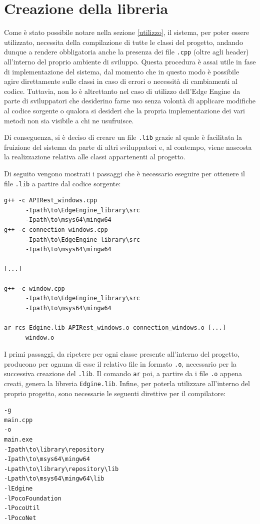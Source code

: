 \section{Creazione della libreria}
Come è stato possibile notare nella sezione \ref{utilizzo}, il sistema, per poter essere utilizzato, necessita della compilazione di tutte le classi del progetto, andando dunque a rendere obbligatoria anche la presenza dei file \texttt{.cpp} (oltre agli header) all'interno del proprio ambiente di sviluppo. Questa procedura è assai utile in fase di implementazione del sistema, dal momento che in questo modo è possibile agire direttamente sulle classi in caso di errori o necessità di cambiamenti al codice. Tuttavia, non lo è altrettanto nel caso di utilizzo dell'Edge Engine da parte di sviluppatori che desiderino farne uso senza volontà di applicare modifiche al codice sorgente o qualora si desideri che la propria implementazione dei vari metodi non sia visibile a chi ne usufruisce.

Di conseguenza, si è deciso di creare un file \texttt{.lib} grazie al quale è facilitata la fruizione del sistema da parte di altri sviluppatori e, al contempo, viene nascosta la realizzazione relativa alle classi appartenenti al progetto.

Di seguito vengono mostrati i passaggi che è necessario eseguire per ottenere il file \texttt{.lib} a partire dal codice sorgente:

\begin{verbatim}
g++ -c APIRest_windows.cpp 
      -Ipath\to\EdgeEngine_library\src 
      -Ipath\to\msys64\mingw64 
g++ -c connection_windows.cpp 
      -Ipath\to\EdgeEngine_library\src 
      -Ipath\to\msys64\mingw64 

[...]

g++ -c window.cpp
      -Ipath\to\EdgeEngine_library\src 
      -Ipath\to\msys64\mingw64 
 
ar rcs Edgine.lib APIRest_windows.o connection_windows.o [...] 
      window.o
\end{verbatim}

I primi passaggi, da ripetere per ogni classe presente all'interno del progetto, producono per ognuna di esse il relativo file in formato \texttt{.o}, necessario per la successiva creazione del \texttt{.lib}. Il comando \texttt{ar} poi, a partire da i file \texttt{.o} appena creati, genera la libreria \texttt{Edgine.lib}. Infine, per poterla utilizzare all'interno del proprio progetto, sono necessarie le seguenti direttive per il compilatore:

\begin{verbatim}
-g
main.cpp
-o
main.exe
-Ipath\to\library\repository
-Ipath\to\msys64\mingw64
-Lpath\to\library\repository\lib
-Lpath\to\msys64\mingw64\lib
-lEdgine
-lPocoFoundation
-lPocoUtil
-lPocoNet
\end{verbatim}








